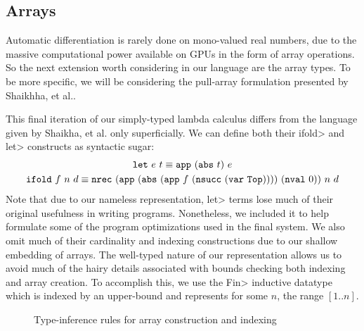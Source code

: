 \subsection{Arrays}\label{sec:arrays}
  Automatic differentiation is rarely done on mono-valued real numbers, due to the massive computational power available on GPUs in the form of array operations.
  So the next extension worth considering in our language are the array types.
  To be more specific, we will be considering the pull-array formulation presented by Shaikhha, et al.\cite{Shaikha2019}.

  This final iteration of our simply-typed lambda calculus differs from the \Fsmooth{} language given by Shaikha, et al. only superficially.
  We can define both their \<ifold> and \<let> constructs as syntactic sugar:
  \begin{gather*}
    \texttt{let}\ e\ t \equiv \texttt{app}\ (\texttt{abs}\ t)\ e \\
    \texttt{ifold}\ f\ n\ d \equiv
    \texttt{nrec}\ (\texttt{app}\ (\texttt{abs}\ (\texttt{app}\ f\ (\texttt{nsucc}\ (\texttt{var}\ \texttt{Top}))))\ (\texttt{nval}\ 0))\ n\ d
  \end{gather*}
  Note that due to our nameless representation, \<let> terms lose much of their original usefulness in writing programs.
  Nonetheless, we included it to help formulate some of the program optimizations used in the final system.
  We also omit much of their cardinality and indexing constructions due to our shallow embedding of arrays.
  The well-typed nature of our representation allows us to avoid much of the hairy details associated with bounds checking both indexing and array creation.
  To accomplish this, we use the \<Fin> inductive datatype which is indexed by an upper-bound and represents for some $n$, the range $[1..n]$.

  \begin{figure}
    \caption{Type-inference rules for array construction and indexing}
    \label{fig:array_infer}
  \end{figure}

